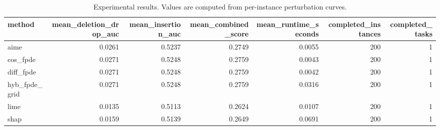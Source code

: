 \begin{table}[t]
\caption{Experimental results. Values are computed from per-instance perturbation curves.}
\label{tab:main_results_computed}
\centering
\begin{tabular}{lrrrrrr}
\toprule
method & mean\_deletion\_drop\_auc & mean\_insertion\_auc & mean\_combined\_score & mean\_runtime\_seconds & completed\_instances & completed\_tasks \\
\midrule
aime & 0.0261 & 0.5237 & 0.2749 & 0.0055 & 200 & 1 \\
cos\_fpde & 0.0271 & 0.5248 & 0.2759 & 0.0043 & 200 & 1 \\
diff\_fpde & 0.0271 & 0.5248 & 0.2759 & 0.0042 & 200 & 1 \\
hyb\_fpde\_grid & 0.0271 & 0.5248 & 0.2759 & 0.0316 & 200 & 1 \\
lime & 0.0135 & 0.5113 & 0.2624 & 0.0107 & 200 & 1 \\
shap & 0.0159 & 0.5139 & 0.2649 & 0.0691 & 200 & 1 \\
\bottomrule
\end{tabular}

\end{table}
